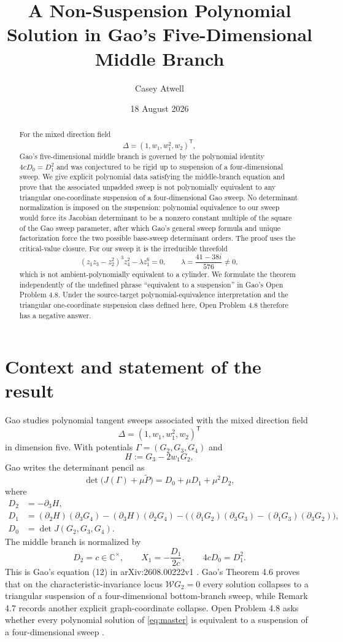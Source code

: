 \documentclass[11pt]{article}
\title{A Non-Suspension Polynomial Solution in Gao's Five-Dimensional Middle Branch}
\author{Casey Atwell}
\date{18 August 2026}
\theoremstyle{definition}
\newcommand{\C}{\mathbb C}
\begin{document}
\maketitle

\begin{abstract}
For the mixed direction field
\[
\Delta=(1,w_1,w_1^2,w_2)^{\mathsf T},
\]
Gao's five-dimensional middle branch is governed by the polynomial identity
$4cD_0=D_1^2$ and was conjectured to be rigid up to suspension of a four-dimensional sweep. We give explicit polynomial data satisfying the middle-branch equation and prove that the associated unpadded sweep is not polynomially equivalent to any triangular one-coordinate suspension of a four-dimensional Gao sweep. No determinant normalization is imposed on the suspension: polynomial equivalence to our sweep would force its Jacobian determinant to be a nonzero constant multiple of the square of the Gao sweep parameter, after which Gao's general sweep formula and unique factorization force the two possible base-sweep determinant orders. The proof uses the critical-value closure. For our sweep it is the irreducible threefold
\[
(z_1z_3-z_2^2)^3z_4^2-\lambda z_1^6=0,
\qquad
\lambda=\frac{41-38i}{576}\neq0,
\]
which is not ambient-polynomially equivalent to a cylinder. We formulate the theorem independently of the undefined phrase ``equivalent to a suspension'' in Gao's Open Problem 4.8. Under the source-target polynomial-equivalence interpretation and the triangular one-coordinate suspension class defined here, Open Problem 4.8 therefore has a negative answer.
\end{abstract}

\section{Context and statement of the result}

Gao studies polynomial tangent sweeps associated with the mixed direction field
\[
\Delta=(1,w_1,w_1^2,w_2)^{\mathsf T}
\]
in dimension five. With potentials $\Gamma=(G_2,G_3,G_4)$ and
\[
H:=G_3-2w_1G_2,
\]
Gao writes the determinant pencil as
\[
\det\bigl(J(\Gamma)+\mu\widetilde P\bigr)
   =D_0+\mu D_1+\mu^2D_2,
\]
where
\begin{align*}
D_2&=-\partial_3H,\\
D_1&=(\partial_2H)(\partial_3G_4)
     -(\partial_3H)(\partial_2G_4)
     -\bigl((\partial_1G_2)(\partial_3G_3)
     -(\partial_1G_3)(\partial_3G_2)\bigr),\\
D_0&=\det J(G_2,G_3,G_4).
\end{align*}
The middle branch is normalized by
\begin{equation}
D_2=c\in\C^\times,
\qquad
X_1=-\frac{D_1}{2c},
\qquad
4cD_0=D_1^2.
\label{eq:master}
\end{equation}
This is Gao's equation (12) in arXiv:2608.00222v1 \cite{Gao2026}. Gao's Theorem 4.6 proves that on the characteristic-invariance locus $\mathcal W G_2=0$ every solution collapses to a triangular suspension of a four-dimensional bottom-branch sweep, while Remark 4.7 records another explicit graph-coordinate collapse. Open Problem 4.8 asks whether every polynomial solution of \eqref{eq:master} is equivalent to a suspension of a four-dimensional sweep \cite{Gao2026}.
\end{document}
